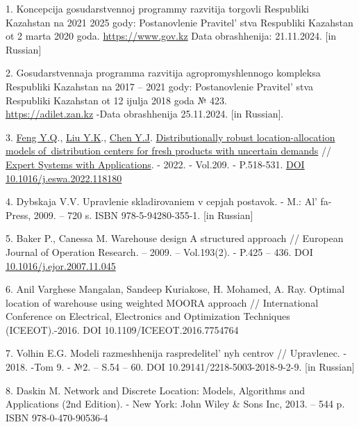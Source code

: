 \begin{references}
1. Koncepcija gosudarstvennoj programmy razvitija torgovli Respubliki
Kazahstan na 2021
2025 gody: Postanovlenie Pravitel' stva Respubliki
Kazahstan ot 2 marta 2020 goda.
\href{https://www.gov.kz/memleket/entities/mti/documents/details/61426?lang=ru-}{https://www.gov.kz}
Data obrash\-henija: 21.11.2024. {[}in Russian{]}

2. Gosudarstvennaja programma razvitija agropromyshlennogo kompleksa
Respubliki Kazahstan na 2017 -- 2021 gody: Postanovlenie Pravitel' stva
Respubliki Kazahstan ot 12 ijulja 2018 goda № 423.\\
\href{https://adilet.zan.kz/rus/docs/P1800000423}{https://adilet.zan.kz} -Data obrashhenija
25.11.2024. {[}in Russian{]}.

3. \href{https://www.webofscience.com/wos/author/record/34864370}{Feng
Y.Q}.,
\href{https://www.webofscience.com/wos/author/record/33997583}{Liu
Y.K}.,
\href{https://www.webofscience.com/wos/author/record/34807908}{Chen
Y.J}.
\href{https://www.webofscience.com/wos/woscc/full-record/WOS:000859686100002}{Distributionally
robust location-allocation models of~distribution centers for fresh
products with uncertain demands} //
\href{https://www.sciencedirect.com/journal/expert-systems-with-applications}{Expert
Systems with Applications}. - 2022. - Vol.209. - P.518-531.
\href{https://doi.org/10.1016/j.eswa.2022.118180}{DOI
10.1016/j.eswa.2022.118180}

4. Dybskaja V.V. Upravlenie skladirovaniem v cepjah postavok. - M.:
Al' fa-Press, 2009. -- 720 s. ISBN 978-5-94280-355-1.
{[}in Russian{]}

5. Baker P., Canessa M. Warehouse design A structured approach //
European Journal of Operation Research. -- 2009. -- Vol.193(2). - P.425 -- 436. DOI
\href{http://dx.doi.org/10.1016/j.ejor.2007.11.045}{10.1016/j.ejor.2007.11.045}

6. Anil Varghese Mangalan, Sandeep Kuriakose, H. Mohamed, A. Ray. Optimal
location of warehouse using weighted MOORA approach // International
Conference on Electrical, Electronics and Optimization Techniques
(ICEEOT).-2016. DOI 10.1109/ICEEOT.2016.7754764

7. Volhin E.G. Modeli razmeshhenija raspredelitel' nyh
centrov // Upravlenec. - 2018. -Tom 9. - №2. -- S.54 -- 60. DOI
10.29141/2218-5003-2018-9-2-9. {[}in Russian{]}

8. Daskin M. Network and Discrete Location: Models, Algorithms and
Applications (2nd Edition). - New York: John Wiley \& Sons Inc, 2013. --
544 p. ISBN 978-0-470-90536-4


\end{references}
